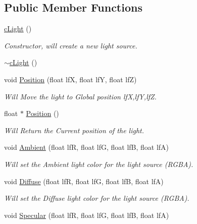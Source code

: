 \subsection*{Public Member Functions}
\begin{DoxyCompactItemize}
\item 
\hyperlink{classc_light_a695d9165a904e1b6ffedbef6fa8cc955}{cLight} ()
\begin{DoxyCompactList}\small\item\em Constructor, will create a new light source. \item\end{DoxyCompactList}\item 
\hyperlink{classc_light_a3354570a7b1a8b5a484b84d3b231a87e}{$\sim$cLight} ()
\item 
void \hyperlink{classc_light_a71f44adf2794e62eba33c58db557d057}{Position} (float lfX, float lfY, float lfZ)
\begin{DoxyCompactList}\small\item\em Will Move the light to Global position lfX,lfY,lfZ. \item\end{DoxyCompactList}\item 
float $\ast$ \hyperlink{classc_light_adee1be4882423cd78568a0ab3ec01e5b}{Position} ()
\begin{DoxyCompactList}\small\item\em Will Return the Current position of the light. \item\end{DoxyCompactList}\item 
void \hyperlink{classc_light_af8ece4e5cf59812835eeb6ca80c485c2}{Ambient} (float lfR, float lfG, float lfB, float lfA)
\begin{DoxyCompactList}\small\item\em Will set the Ambient light color for the light source (RGBA). \item\end{DoxyCompactList}\item 
void \hyperlink{classc_light_a74ae85e3b13ddc3b31a01257f9810e66}{Diffuse} (float lfR, float lfG, float lfB, float lfA)
\begin{DoxyCompactList}\small\item\em Will set the Diffuse light color for the light source (RGBA). \item\end{DoxyCompactList}\item 
void \hyperlink{classc_light_a0c9fac24be43f1b053e3ff8ecc89cd28}{Specular} (float lfR, float lfG, float lfB, float lfA)

\end{DoxyCompactItemize}
